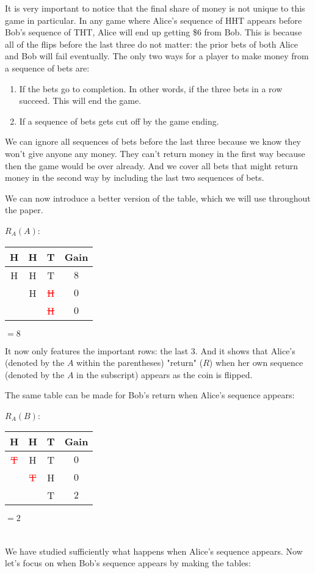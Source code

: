 \documentclass[english,12pt,a4paper,final]{article}
\begin{document}
It is very important to notice that the final share of money is not unique to this game in particular. In any game where Alice's sequence of HHT appears before Bob's sequence of THT, Alice will end up getting \$6 from Bob. This is because all of the flips before the last three do not matter: the prior bets of both Alice and Bob will fail eventually. The only two ways for a player to make money from a sequence of bets are:

\begin{enumerate}
	\item If the bets go to completion. In other words, if the three bets in a row succeed. This will end the game.
	\item If a sequence of bets gets cut off by the game ending.
\end{enumerate}

We can ignore all sequences of bets before the last three because we know they won't give anyone any money. They can't return money in the first way because then the game would be over already. And we cover all bets that might return money in the second way by including the last two sequences of bets.

We can now introduce a better version of the table, which we will use throughout the paper.

$R_A(A)$:
\begin{tabular}{|ccc|c|}
	\hline
	H & H & T & Gain \\
	\hline
	
	\textcolor{OliveGreen}{H} & \textcolor{OliveGreen}{H} & \textcolor{OliveGreen}{T} & $8$ \\
	
	& \textcolor{OliveGreen}{H} & \textcolor{red}{\sout{H}} & $0$ \\
	
	&  & \textcolor{red}{\sout{H}} & $0$ \\
	\hline
\end{tabular}
$=8$

It now only features the important rows: the last 3. And it shows that Alice's (denoted by the $A$ within the parentheses) "return" ($R$) when her own sequence (denoted by the $A$ in the subscript) appears as the coin is flipped.

The same table can be made for Bob's return when Alice's sequence appears:

$R_A(B)$:
\begin{tabular}{|ccc|c|}
	\hline
	H & H & T & Gain \\
	\hline
	
	\textcolor{red}{\sout{T}} & H & T & $0$ \\
	
	& \textcolor{red}{\sout{T}} & H & $0$ \\
	
	&  & \textcolor{OliveGreen}{T} & $2$ \\
	\hline
\end{tabular}
$=2$
\\\\\\
We have studied sufficiently what happens when Alice's sequence appears. Now let's focus on when Bob's sequence appears by making the tables:
\end{document}
